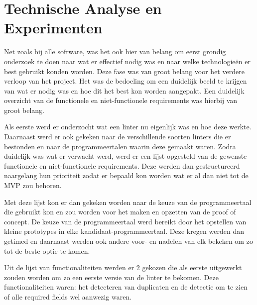 \chapter{Technische Analyse en Experimenten}
\label{ch:fase2}

Net zoals bij alle software, was het ook hier van belang om eerst grondig onderzoek te doen naar wat er effectief nodig was en naar welke technologieën er best gebruikt konden worden.
Deze fase was van groot belang voor het verdere verloop van het project. Het was de bedoeling om een duidelijk beeld te krijgen van wat er nodig was en hoe dit het best kon worden aangepakt. Een duidelijk overzicht van de functionele en niet-functionele requirements was hierbij van groot belang. 

Als eerste werd er onderzocht wat een linter nu eigenlijk was en hoe deze werkte. Daarnaast werd er ook gekeken naar de verschillende soorten linters die er bestonden en naar de programmeertalen waarin deze gemaakt waren. Zodra duidelijk was wat er verwacht werd, werd er een lijst opgesteld van de gewenste functionele en niet-functionele requirements. Deze werden dan gestructureerd naargelang hun prioriteit zodat er bepaald kon worden wat er al dan niet tot de MVP zou behoren.

Met deze lijst kon er dan gekeken worden naar de keuze van de programmeertaal die gebruikt kon en zou worden voor het maken en opzetten van de proof of concept. De keuze van de programmeertaal werd bereikt door het opstellen van kleine prototypes in elke kandidaat-programmeertaal. Deze kregen werden dan getimed en daarnaast werden ook andere voor- en nadelen van elk bekeken om zo tot de beste optie te komen.

Uit de lijst van functionaliteiten werden er 2 gekozen die als eerste uitgewerkt zouden worden om zo een eerste versie van de linter te bekomen. Deze functionaliteiten waren: het detecteren van duplicaten en de detectie om te zien of alle required fields wel aanwezig waren.

